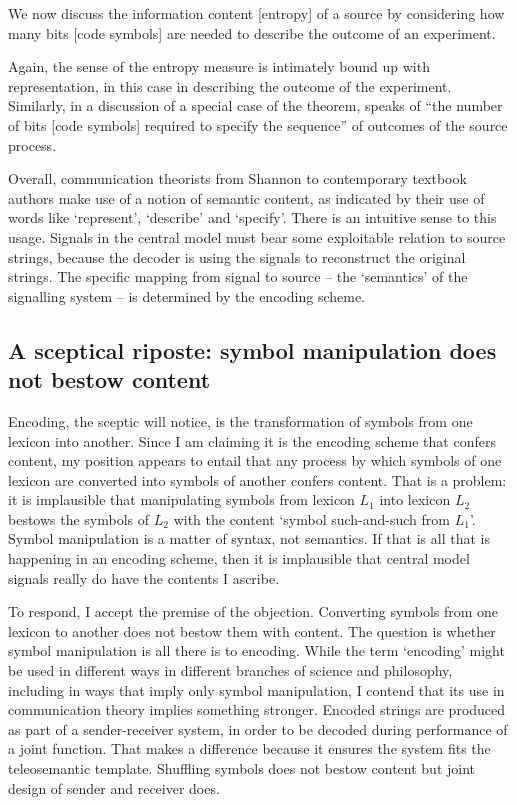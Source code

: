 \documentclass[12pt]{article}
\begin{document}
\begin{myquote}
We now discuss the information content [entropy] of a source by considering how many bits [code symbols] are needed to describe the outcome of an experiment.
\par\hspace*{\fill}\citet[73]{mackay2003information}
\end{myquote}

\noindent Again, the sense of the entropy measure is intimately bound up with representation, in this case in describing the outcome of the experiment.
Similarly, in a discussion of a special case of the theorem, \citet[397]{shannon1948mathematicalc} speaks of ``the number of bits [code symbols] required to specify the sequence'' of outcomes of the source process.

Overall, communication theorists from Shannon to contemporary textbook authors make use of a notion of semantic content, as indicated by their use of words like `represent', `describe' and `specify'.
There is an intuitive sense to this usage.
Signals in the central model must bear some exploitable relation to source strings, because the decoder is using the signals to reconstruct the original strings.
The specific mapping from signal to source -- the `semantics' of the signalling system -- is determined by the encoding scheme.

\subsection{A sceptical riposte: symbol manipulation does not bestow content}

Encoding, the sceptic will notice, is the transformation of symbols from one lexicon into another.
Since I am claiming it is the encoding scheme that confers content, my position appears to entail that any process by which symbols of one lexicon are converted into symbols of another confers content.
That is a problem: it is implausible that manipulating symbols from lexicon $L_1$ into lexicon $L_2$ bestows the symbols of $L_2$ with the content `symbol such-and-such from $L_1$'.
Symbol manipulation is a matter of syntax, not semantics.
If that is all that is happening in an encoding scheme, then it is implausible that central model signals really do have the contents I ascribe.

To respond, I accept the premise of the objection.
Converting symbols from one lexicon to another does not bestow them with content.
The question is whether symbol manipulation is all there is to encoding.
While the term `encoding' might be used in different ways in different branches of science and philosophy, including in ways that imply only symbol manipulation, I contend that its use in communication theory implies something stronger.
Encoded strings are produced as part of a sender-receiver system, in order to be decoded during performance of a joint function.
That makes a difference because it ensures the system fits the teleosemantic template.
Shuffling symbols does not bestow content but joint design of sender and receiver does.
\end{document}
